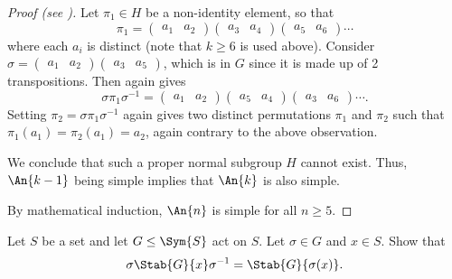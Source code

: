 \begin{proof}[Proof (see {\cite[pp.~149--150, Theorem 24]{dummit_foote_2004}})]
    Let $\pi_1 \in H$ be a non-identity element, so that
    \[
        \pi_1 = \begin{pmatrix}a_1&a_2\end{pmatrix} \begin{pmatrix}a_3&a_4\end{pmatrix} \begin{pmatrix}a_5&a_6\end{pmatrix}\cdots
    \]
    where each $a_i$ is distinct (note that $k \geq 6$ is used above). Consider $\sigma = \begin{pmatrix}a_1&a_2\end{pmatrix} \begin{pmatrix}a_3&a_5\end{pmatrix}$, which is in $G$ since it is made up of 2 transpositions. Then  again gives
    \[
        \sigma\pi_1\sigma^{-1} = \begin{pmatrix}a_1&a_2\end{pmatrix} \begin{pmatrix}a_5&a_4\end{pmatrix} \begin{pmatrix}a_3&a_6\end{pmatrix}\cdots.
    \]
    Setting $\pi_2 = \sigma\pi_1\sigma^{-1}$ again gives two distinct permutations $\pi_1$ and $\pi_2$ such that $\pi_1(a_1) = \pi_2(a_1) = a_2$, again contrary to the above observation.

    We conclude that such a proper normal subgroup $H$ cannot exist. Thus, $\An{k-1}$ being simple implies that $\An{k}$ is also simple.

    By mathematical induction, $\An{n}$ is simple for all $n \geq 5$.
\end{proof}

\begin{exercise}\label{exercise-conjugate-of-stabilizer}
    Let $S$ be a set and let $G \leq \Sym{S}$ act on $S$. Let $\sigma \in G$ and $x \in S$. Show that
    \[
        \sigma\Stab{G}{x}\sigma^{-1} = \Stab{G}{\sigma(x)}.
    \]
\end{exercise}

